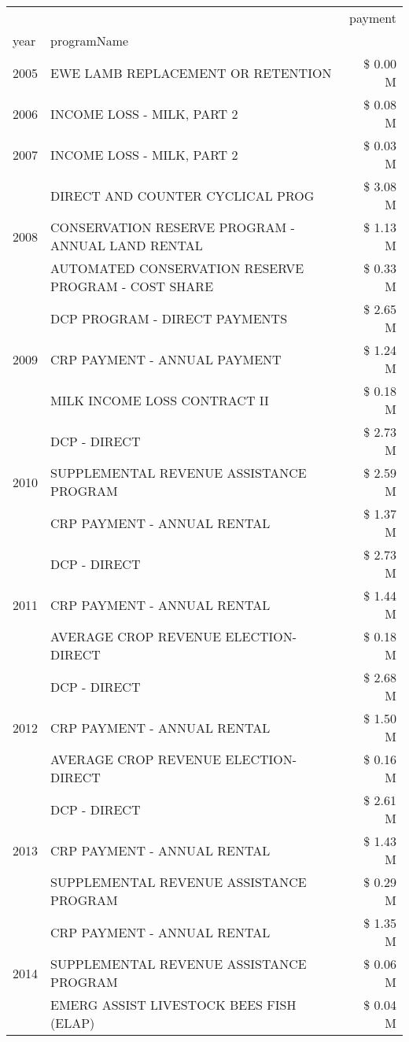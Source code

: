 \begin{tabular}{llr}
\toprule
 &  & payment \\
year & programName &  \\
\midrule
2005 & EWE LAMB REPLACEMENT OR RETENTION & \$ 0.00 M \\
\cline{1-3}
2006 & INCOME LOSS - MILK, PART 2 & \$ 0.08 M \\
\cline{1-3}
2007 & INCOME LOSS - MILK, PART 2 & \$ 0.03 M \\
\cline{1-3}
\multirow[t]{3}{*}{2008} & DIRECT AND COUNTER CYCLICAL PROG & \$ 3.08 M \\
 & CONSERVATION RESERVE PROGRAM - ANNUAL LAND RENTAL & \$ 1.13 M \\
 & AUTOMATED CONSERVATION RESERVE PROGRAM - COST SHARE & \$ 0.33 M \\
\cline{1-3}
\multirow[t]{3}{*}{2009} & DCP PROGRAM - DIRECT PAYMENTS & \$ 2.65 M \\
 & CRP PAYMENT - ANNUAL PAYMENT & \$ 1.24 M \\
 & MILK INCOME LOSS CONTRACT II & \$ 0.18 M \\
\cline{1-3}
\multirow[t]{3}{*}{2010} & DCP - DIRECT & \$ 2.73 M \\
 & SUPPLEMENTAL REVENUE ASSISTANCE PROGRAM & \$ 2.59 M \\
 & CRP PAYMENT - ANNUAL RENTAL & \$ 1.37 M \\
\cline{1-3}
\multirow[t]{3}{*}{2011} & DCP - DIRECT & \$ 2.73 M \\
 & CRP PAYMENT - ANNUAL RENTAL & \$ 1.44 M \\
 & AVERAGE CROP REVENUE ELECTION-DIRECT & \$ 0.18 M \\
\cline{1-3}
\multirow[t]{3}{*}{2012} & DCP - DIRECT & \$ 2.68 M \\
 & CRP PAYMENT - ANNUAL RENTAL & \$ 1.50 M \\
 & AVERAGE CROP REVENUE ELECTION-DIRECT & \$ 0.16 M \\
\cline{1-3}
\multirow[t]{3}{*}{2013} & DCP - DIRECT & \$ 2.61 M \\
 & CRP PAYMENT - ANNUAL RENTAL & \$ 1.43 M \\
 & SUPPLEMENTAL REVENUE ASSISTANCE PROGRAM & \$ 0.29 M \\
\cline{1-3}
\multirow[t]{3}{*}{2014} & CRP PAYMENT - ANNUAL RENTAL & \$ 1.35 M \\
 & SUPPLEMENTAL REVENUE ASSISTANCE PROGRAM & \$ 0.06 M \\
 & EMERG ASSIST LIVESTOCK BEES FISH (ELAP) & \$ 0.04 M \\

\end{tabular}
